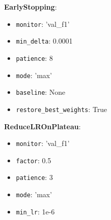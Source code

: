 \documentclass[11pt,a4paper]{article}
\begin{document}
\textbf{EarlyStopping}:
\begin{itemize}
\item \verb|monitor|: 'val\_f1'
\item \verb|min_delta|: 0.0001
\item \verb|patience|: 8
\item \verb|mode|: 'max'
\item \verb|baseline|: None
\item \verb|restore_best_weights|: True
\end{itemize}

\textbf{ReduceLROnPlateau}:
\begin{itemize}
\item \verb|monitor|: 'val\_f1'
\item \verb|factor|: 0.5
\item \verb|patience|: 3
\item \verb|mode|: 'max'
\item \verb|min_lr|: 1e-6
\end{itemize}
\end{document}
